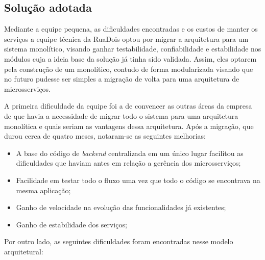 \subsection{Solução adotada}

Mediante a equipe pequena, as dificuldades encontradas e os custos de manter os serviços a equipe
técnica da RuaDois optou por migrar a arquitetura para um sistema monolítico, visando ganhar
testabilidade, confiabilidade e estabilidade nos módulos cuja a ideia base da solução já tinha sido
validada. Assim, eles optarem pela construção de um monolítico, contudo de forma modularizada
visando que no futuro pudesse ser simples a migração de volta para uma arquitetura de
microsserviços.

A primeira dificuldade da equipe foi a de convencer as outras áreas da empresa de que havia a
necessidade de migrar todo o sistema para uma arquitetura monolítica e quais seriam as vantagens
dessa arquitetura. Após a migração, que durou cerca de quatro meses, notaram-se as seguintes melhorias:

\begin{itemize}
    \item A base do código de \textit{backend} centralizada em um único lugar facilitou as
        dificuldades que haviam antes em relação a gerência dos microsserviços;
    \item Facilidade em testar todo o fluxo uma vez que todo o código se encontrava na mesma
        aplicação;
    \item Ganho de velocidade na evolução das funcionalidades já existentes;
    \item Ganho de estabilidade dos serviços;
\end{itemize}

Por outro lado, as seguintes dificuldades foram encontradas nesse modelo arquitetural:

